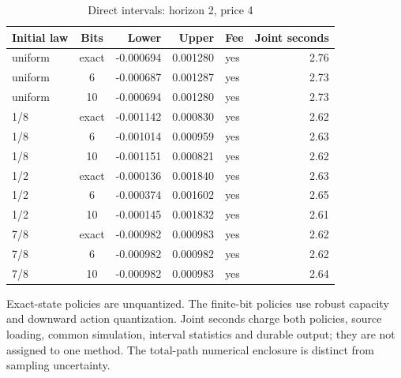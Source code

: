 \begin{table}[htbp]
\centering
\caption{Direct intervals: horizon 2, price 4}\label{tab:direct-full48-2-4}
\footnotesize
\begin{tabular}{lcrrlr}
\toprule
Initial law & Bits & Lower & Upper & Fee & Joint seconds\\
\midrule
uniform & exact & -0.000694 & 0.001280 & yes & 2.76 \\
uniform & 6 & -0.000687 & 0.001287 & yes & 2.73 \\
uniform & 10 & -0.000694 & 0.001280 & yes & 2.73 \\
1/8 & exact & -0.001142 & 0.000830 & yes & 2.62 \\
1/8 & 6 & -0.001014 & 0.000959 & yes & 2.63 \\
1/8 & 10 & -0.001151 & 0.000821 & yes & 2.62 \\
1/2 & exact & -0.000136 & 0.001840 & yes & 2.63 \\
1/2 & 6 & -0.000374 & 0.001602 & yes & 2.65 \\
1/2 & 10 & -0.000145 & 0.001832 & yes & 2.61 \\
7/8 & exact & -0.000982 & 0.000983 & yes & 2.62 \\
7/8 & 6 & -0.000982 & 0.000982 & yes & 2.62 \\
7/8 & 10 & -0.000982 & 0.000983 & yes & 2.64 \\
\bottomrule
\end{tabular}
\begin{minipage}{0.97\linewidth}\footnotesize\vspace{3pt}
Exact-state policies are unquantized. The finite-bit policies use robust capacity and downward action quantization. Joint seconds charge both policies, source loading, common simulation, interval statistics and durable output; they are not assigned to one method. The total-path numerical enclosure is distinct from sampling uncertainty.
\end{minipage}
\end{table}
